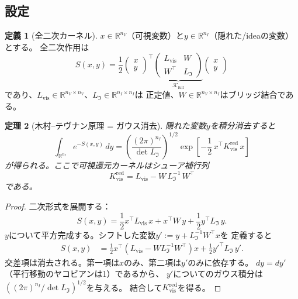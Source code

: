\documentclass[12pt]{article}
\theoremstyle{plain}
\newtheorem{theorem}{定理}[section]
\theoremstyle{definition}
\newtheorem{definition}[theorem]{定義}
\numberwithin{equation}{section}
\newcommand{\R}{\mathbb{R}}
\newcommand{\vis}{\mathrm{vis}}
\newcommand{\red}{\mathrm{red}}
\newcommand{\fI}{\mathfrak{I}}
\begin{document}
\subsection{設定}

\begin{definition}[全二次カーネル]
$x\in\R^{n_V}$（可視変数）と$y\in\R^{n_I}$（隠れた/ideaの変数）とする。
全二次作用は
\begin{equation}
S(x,y) = \frac{1}{2}
\begin{pmatrix}x\\y\end{pmatrix}^{\!\top}
\underbrace{\begin{pmatrix}
L_{\vis} & W\\
W^\top & L_{\fI}
\end{pmatrix}}_{\mathcal{K}_{\mathrm{full}}}
\begin{pmatrix}x\\y\end{pmatrix}
\end{equation}
であり、$L_{\vis}\in\R^{n_V\times n_V}$、$L_{\fI}\in\R^{n_I\times n_I}$は
正定値、$W\in\R^{n_V\times n_I}$はブリッジ結合である。
\end{definition}

\begin{theorem}[木村--テヴナン原理 = ガウス消去]\label{thm:KT}
隠れた変数$y$を積分消去すると
\begin{equation}\label{eq:gausselim}
\int_{\R^{n_I}} e^{-S(x,y)}\,dy
= \left(\frac{(2\pi)^{n_I}}{\det L_{\fI}}\right)^{1/2}
\exp\!\left[-\frac{1}{2}\,x^\top K_{\vis}^{\red}\,x\right]
\end{equation}
が得られる。ここで可視還元カーネルはシューア補行列
\begin{equation}\label{eq:schur}
\boxed{K_{\vis}^{\red} = L_{\vis} - W\,L_{\fI}^{-1}\,W^\top}
\end{equation}
である。
\end{theorem}

\begin{proof}
二次形式を展開する：
\begin{equation}
S(x,y) = \frac{1}{2}x^\top L_{\vis}\,x
+ x^\top W\,y
+ \frac{1}{2}y^\top L_{\fI}\,y.
\end{equation}
$y$について平方完成する。シフトした変数$y' := y + L_{\fI}^{-1}W^\top x$を
定義すると
\begin{align}
S(x,y) &= \frac{1}{2}x^\top\!\left(L_{\vis}-WL_{\fI}^{-1}W^\top\right)x
+ \frac{1}{2}y'^\top L_{\fI}\,y'.
\end{align}
交差項は消去される。第一項は$x$のみ、第二項は$y'$のみに依存する。
$dy=dy'$（平行移動のヤコビアンは1）であるから、
$y'$についてのガウス積分は
$\left((2\pi)^{n_I}/\det L_{\fI}\right)^{1/2}$を与える。
結合して$K_{\vis}^{\red}$を得る。
\end{proof}
\end{document}
